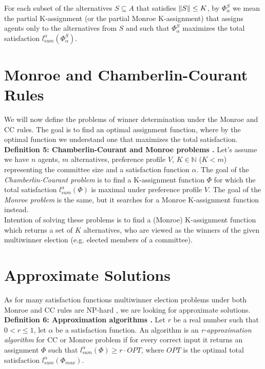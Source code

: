 For each subset of the alternatives $S \subseteq A$ that satisfies $\lVert S\rVert \leq K$, by $\Phi^{S}_{\alpha}$ we mean the partial K-assignment (or the partial Monroe K-assignment) that assigns agents only to the alternatives from $S$ and such that $\Phi^{S}_{\alpha}$ maximizes the total satisfaction $l^{\alpha}_{sum}(\Phi^{S}_{\alpha})$.

\section{Monroe and Chamberlin-Courant Rules}

We will now define the problems of winner determination under the Monroe and CC rules. The goal is to find an optimal assignment function, where by the optimal function we understand one that maximizes the total satisfaction.
\\

\noindent
\textbf{Definition 5: Chamberlin-Courant and Monroe problems \cite{1}.} \hspace{.1in}  Let's assume we have $n$ agents, $m$ alternatives, preference profile $V$, $K \in \mathbb{N}$ ($K < m$) representing the committee size and a satisfaction function $\alpha$. The goal of the \textit{Chamberlin-Courant problem} is to find a K-assignment function $\Phi$ for which the total satisfaction $l^{\alpha}_{sum}(\Phi)$ is maximal under preference profile $V$. The goal of the \textit{Monroe problem} is the same, but it searches for a Monroe K-assignment function instead.
\\

Intention of solving these problems is to find a (Monroe) K-assignment function which returns a set of $K$ alternatives, who are viewed as the winners of the given multiwinner election (e.g. elected members of a committee).

\section{Approximate Solutions}

As for many satisfaction functions multiwinner election problems under both Monroe and CC rules are NP-hard \cite{3, 4, 2}, we are looking for approximate solutions.
\\

\noindent
\textbf{Definition 6: Approximation algorithms \cite{1}.} \hspace{.1in} Let $r$ be a real number such that $0 < r \leq 1$, let $\alpha$ be a satisfaction function. An algorithm is an \textit{r-approximation algorithm} for CC or Monroe problem if for every correct input it returns an assignment $\Phi$ such that $l^{\alpha}_{sum}(\Phi) \geq r \cdot OPT$, where $OPT$ is the optimal total satisfaction $l^{\alpha}_{sum}(\Phi_{max})$.
\\

